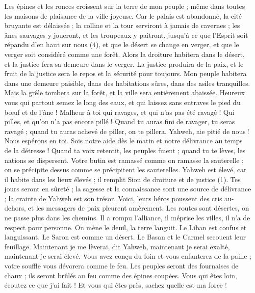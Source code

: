 \begin{multicols}{2}
{Les épines et les ronces croissent sur la terre de mon peuple ; même dans toutes les maisons de plaisance de la ville joyeuse.
Car le palais est abandonné, la cité bruyante est délaissée ; la colline et la tour serviront à jamais de cavernes ; les ânes sauvages y joueront, et les troupeaux y paîtront,
jusqu'à ce que l'Esprit soit répandu d'en haut sur nous (4), et que le désert se change en verger, et que le verger soit considéré comme une forêt.
Alors la droiture habitera dans le désert, et la justice fera sa demeure dans le verger.
La justice produira de la paix, et le fruit de la justice sera le repos et la sécurité pour toujours.
Mon peuple habitera dans une demeure paisible, dans des habitations sûres, dans des asiles tranquilles.
Mais la grêle tombera sur la forêt, et la ville sera entièrement abaissée.
Heureux vous qui partout semez le long des eaux, et qui laissez sans entraves le pied du bœuf et de l'âne !
\VerseOne{}Malheur à toi qui ravages, et qui n'as pas été ravagé ! Qui pilles, et qu’on n’a pas encore pillé ! Quand tu auras fini de ravager, tu seras ravagé ; quand tu auras achevé de piller, on te pillera.
Yahweh, aie pitié de nous ! Nous espérons en toi. Sois notre aide dès le matin et notre délivrance au temps de la détresse !
Quand ta voix retentit, les peuples fuient ; quand tu te lèves, les nations se dispersent.
Votre butin est ramassé comme on ramasse la sauterelle ; on se précipite dessus comme se précipitent les sauterelles.
Yahweh est élevé, car il habite dans les lieux élevés ; il remplit Sion de droiture et de justice (1).
Tes jours seront en sûreté ; la sagesse et la connaissance sont une source de délivrance ; la crainte de Yahweh est son trésor.
Voici, leurs héros poussent des cris au-dehors, et les messagers de paix pleurent amèrement.
Les routes sont désertes, on ne passe plus dans les chemins. Il a rompu l'alliance, il méprise les villes, il n’a de respect pour personne.
On mène le deuil, la terre languit. Le Liban est confus et languissant. Le Saron est comme un désert. Le Basan et le Carmel secouent leur feuillage.
Maintenant je me lèverai, dit Yahweh, maintenant je serai exalté, maintenant je serai élevé.
Vous avez conçu du foin et vous enfanterez de la paille ; votre souffle vous dévorera comme le feu.
Les peuples seront des fournaises de chaux ; ils seront brûlés au feu comme des épines coupées.
Vous qui êtes loin, écoutez ce que j'ai fait ! Et vous qui êtes près, sachez quelle est ma force !
}
\end{multicols}
